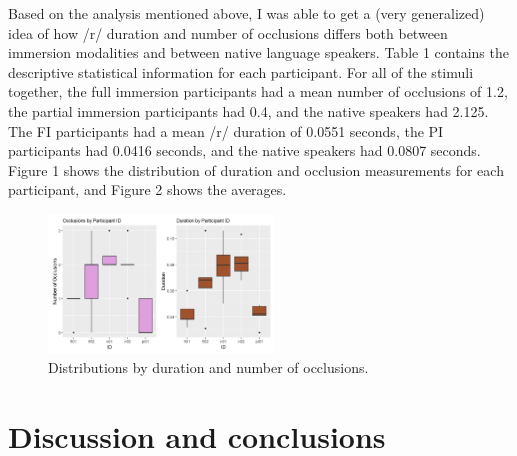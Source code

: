 \documentclass[
  a4paper,
  11pt,
  twocolumn]{article}
\begin{document}
Based on the analysis mentioned above, I was able to get a (very
generalized) idea of how /r/ duration and number of occlusions differs
both between immersion modalities and between native language speakers.
Table 1 contains the descriptive statistical information for each
participant. For all of the stimuli together, the full immersion
participants had a mean number of occlusions of 1.2, the partial
immersion participants had 0.4, and the native speakers had 2.125. The
FI participants had a mean /r/ duration of 0.0551 seconds, the PI
participants had 0.0416 seconds, and the native speakers had 0.0807
seconds. Figure 1 shows the distribution of duration and occlusion
measurements for each participant, and Figure 2 shows the averages.

\begin{figure}[!ht]
\begin{center}
\includegraphics[width=6cm]{./includes/figures/fig1.png}
\caption{Distributions by duration and number of occlusions.}\label{fig:Distributions}
\end{center}
\end{figure}

\section{Discussion and conclusions}
\end{document}
